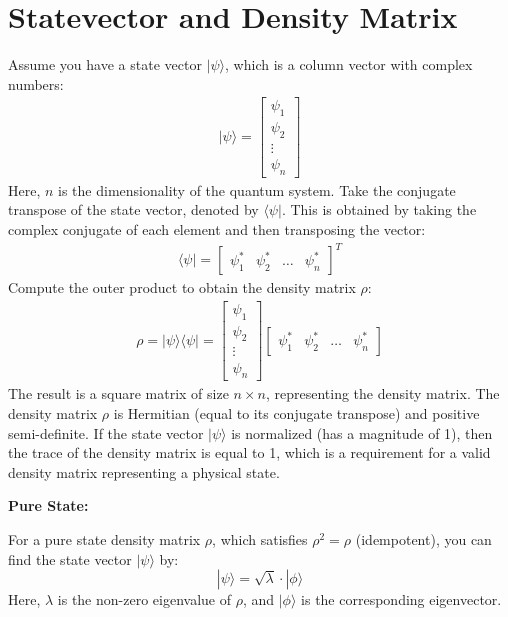 \documentclass{article}
\begin{document}
\section{Statevector and Density Matrix} %
\label{sec:Statevector and Density Matrix}
Assume you have a state vector $|\psi\rangle$, which is a column vector with complex numbers:
\begin{align}
	|\psi\rangle = \begin{bmatrix} \psi_1 \\ \psi_2 \\ \vdots \\ \psi_n \end{bmatrix}
\end{align}
Here, $n$ is the dimensionality of the quantum system.
Take the conjugate transpose of the state vector, denoted by $\langle \psi|$. This is obtained by taking the complex conjugate of each element and then transposing the vector:
\begin{align}
	\langle \psi| = \begin{bmatrix} \psi_1^* & \psi_2^* & \ldots & \psi_n^* \end{bmatrix}^T
\end{align}
Compute the outer product to obtain the density matrix $\rho$:
\begin{align}
	\rho = |\psi\rangle \langle \psi| = \begin{bmatrix} \psi_1 \\ \psi_2 \\ \vdots \\ \psi_n \end{bmatrix} \begin{bmatrix} \psi_1^* & \psi_2^* & \ldots & \psi_n^* \end{bmatrix}
\end{align}
The result is a square matrix of size $n \times n$, representing the density matrix.
The density matrix $\rho$ is Hermitian (equal to its conjugate transpose) and positive semi-definite. If the state vector $|\psi\rangle$ is normalized (has a magnitude of 1), then the trace of the density matrix is equal to 1, which is a requirement for a valid density matrix representing a physical state.


\textbf{Pure State:}

For a pure state density matrix $\rho$, which satisfies $\rho^2 = \rho$ (idempotent), you can find the state vector $|\psi\rangle$ by:
\[ |\psi\rangle = \sqrt{\lambda} \cdot |\phi\rangle \]
Here, $\lambda$ is the non-zero eigenvalue of $\rho$, and $|\phi\rangle$ is the corresponding eigenvector.
\end{document}
